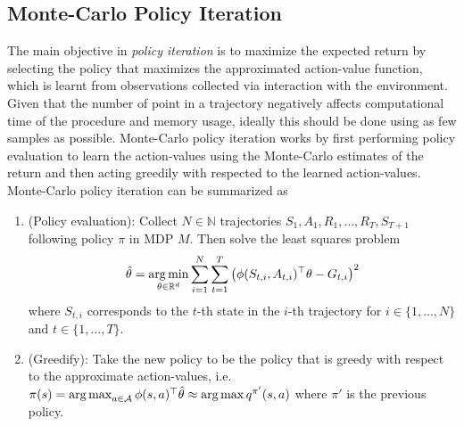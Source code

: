 \subsection{Monte-Carlo Policy Iteration} The main objective in \textit{policy iteration} is to maximize the expected return by selecting the policy that maximizes the approximated action-value function, which is learnt from observations collected via interaction with the environment. Given that the number of point in a trajectory negatively affects computational time of the procedure and memory usage, ideally this should be done using as few samples as possible. Monte-Carlo policy iteration works by first performing policy evaluation to learn the action-values using the Monte-Carlo estimates of the return and then acting greedily with respected to the learned action-values. Monte-Carlo policy iteration can be summarized as 
\begin{enumerate}
    \item (Policy evaluation): Collect $N \in \mathbb{N}$ trajectories $S_{1},A_1,R_1,\dotsc,R_T,S_{T+1}$ following policy $\pi$ in MDP $M$. Then solve the least squares problem 
    \begin{align*}
        \hat\theta = \mathop{\rm arg\,min}_{\theta \in \mathbb{R}^d} \sum_{i=1}^N\sum_{t=1}^T \left(\phi(S_{t,i},A_{t,i})^\top \theta - G_{t,i}\right)^2
    \end{align*}
    where $S_{t,i}$ corresponds to the $t$-th state in the $i$-th trajectory for $i \in \{1,\dotsc,N\}$ and $t \in \{1,\dotsc,T\}$.
    \item (Greedify): Take the new policy to be the policy that is greedy with respect to the approximate action-values, i.e. $\pi(s) = \mathop{\rm arg\,max}_{a \in \mathcal{A}} \phi(s,a)^\top \hat\theta \approx \mathop{\rm arg\,max} q^{\pi'}(s,a)$ where $\pi'$ is the previous policy.
\end{enumerate}
